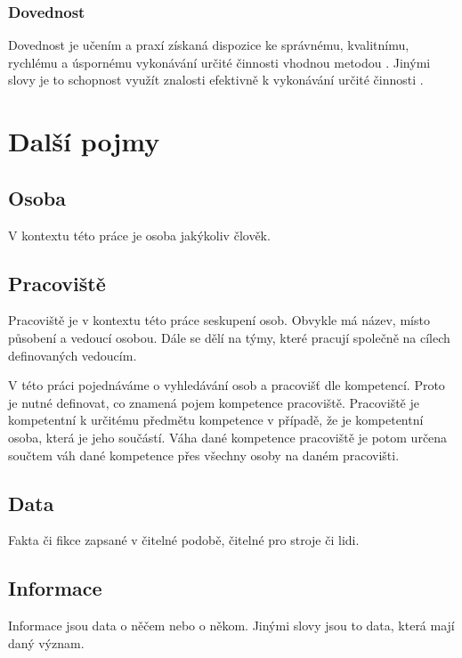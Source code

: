 \subsubsection*{Dovednost}
Dovednost je učením a praxí získaná dispozice ke správnému, kvalitnímu, rychlému a úspornému vykonávání určité činnosti vhodnou metodou \cite{cite:03}. Jinými slovy je to schopnost využít znalosti efektivně k vykonávání určité činnosti \cite{cite:04}.
\section{Další pojmy}
\subsection*{Osoba}
V kontextu této práce je osoba jakýkoliv člověk.
\subsection*{Pracoviště}
Pracoviště je v kontextu této práce seskupení osob. Obvykle má název, místo působení a vedoucí osobou. Dále se dělí na týmy, které pracují společně na cílech definovaných vedoucím.\par
V této práci pojednáváme o vyhledávání osob a pracovišť dle kompetencí. Proto je nutné definovat, co znamená pojem kompetence pracoviště. Pracoviště je kompetentní k určitému předmětu kompetence v případě, že je kompetentní osoba, která je jeho součástí. Váha dané kompetence pracoviště je potom určena součtem váh dané kompetence přes všechny osoby na daném pracovišti.
\subsection*{Data}
Fakta či fikce zapsané v čitelné podobě, čitelné pro stroje či lidi.
\subsection*{Informace}
Informace jsou data o něčem nebo o někom. Jinými slovy jsou to data, která mají daný význam.
